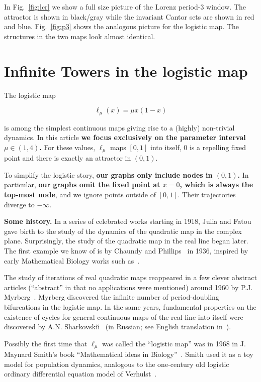\documentclass{article}
\newcommand{\BF}{\boldmath}
\newcommand{\beq}{\begin{linenomath}\begin{equation}} %
\newcommand{\eeq}{\end{equation}\end{linenomath}} %
\begin{document}
In Fig.~\ref{fig:lcr} we show a full size picture of the Lorenz period-3 window. 
The attractor is shown in black/gray while the invariant Cantor sets are shown in red and blue.
Fig.~\ref{fig:p3} shows the analogous picture for the logistic map. 
The structures in the two maps look almost identical.


%
\section{Infinite Towers in the logistic map}
\label{sec:lm}
%
The logistic map
\beq
\label{eq:lm}
\ell_\mu(x) = \mu x(1-x)
\eeq
is among the simplest continuous maps giving rise to a (highly) non-trivial dynamics. 
In this article
{\bf we focus exclusively on the parameter interval
\BF$\mu \in (1,4)$.} For these values,
$\ell_\mu$ maps $[0,1]$ into itself, 0 is a repelling fixed point and there is exactly an attractor in $(0,1)$.

To simplify the logistic story, {\bf our graphs only include nodes in \BF$(0,1)$.}
In particular, {\bf our graphs omit the fixed point at \BF$x=0$, which is always the top-most node}, and we ignore points outside of $[0,1]$. Their trajectories diverge to $-\infty.$

{\bf Some history.}
In a series of celebrated works starting in 1918, Julia and Fatou gave birth to the study of the dynamics of the quadratic map in the complex plane.
Surprisingly, the study of the quadratic map in the real line began later. The first example we know of is by Chaundy and Phillips~\cite{CP36} in 1936, inspired by early Mathematical Biology works such as~\cite{Bai31}. %

The study of iterations of real quadratic maps reappeared in a few clever abstract articles (``abstract'' in that no applications were mentioned) around 1960 by P.J. Myrberg~\cite{Myr58,Myr62,Myr63}. %
Myrberg discovered the infinite number of period-doubling bifurcations in the logistic map. In the same years, fundamental properties on the existence of cycles for general continuous maps of the real line into itself were discovered by A.N. Sharkovski{\u\i}~\cite{Sha64a} (in Russian; see English translation in~\cite{Sha64b}).

Possibly the first time that $\ell_\mu$ was called the ``logistic map'' was in 1968 in J. Maynard Smith's book ``Mathematical ideas in Biology''~\cite{Smi68}. Smith used it as a toy model for population dynamics, analogous to the one-century old logistic
ordinary differential equation model of Verhulst~\cite{Ver38,VZSC75}. 
\end{document}
